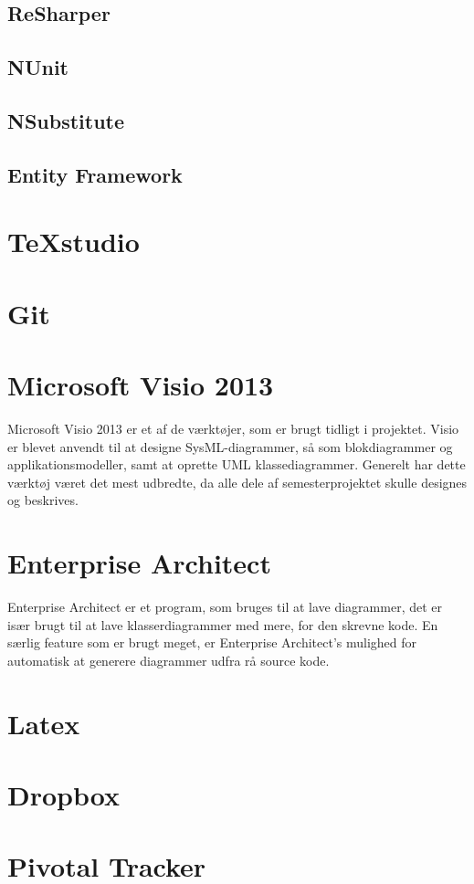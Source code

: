 \subsection*{ReSharper} %

\subsection*{NUnit}

\subsection*{NSubstitute}

\subsection*{Entity Framework}

\section*{TeXstudio}

\section*{Git}

\section*{Microsoft Visio 2013}
Microsoft Visio 2013 er et af de værktøjer, som er brugt tidligt i projektet. Visio er blevet anvendt til at designe SysML-diagrammer, så som blokdiagrammer og applikationsmodeller, samt at oprette UML klassediagrammer. Generelt har dette værktøj været det mest udbredte, da alle dele af semesterprojektet skulle designes og beskrives.

\section*{Enterprise Architect}
Enterprise Architect er et program, som bruges til at lave diagrammer, det er især brugt til at lave klasserdiagrammer med mere, for den skrevne kode. En særlig feature som er brugt meget, er Enterprise Architect's mulighed for automatisk at generere diagrammer udfra rå source kode.

\section*{Latex}

\section*{Dropbox}


\section*{Pivotal Tracker}
